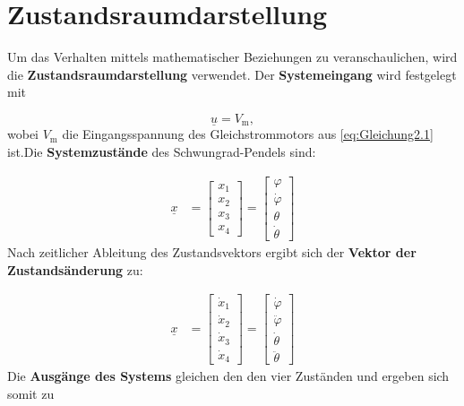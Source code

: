 \pagestyle{aaron}
\section{Zustandsraumdarstellung} \label{sec:Zustandsraumdarstellung}

Um das Verhalten mittels mathematischer Beziehungen zu veranschaulichen, wird die \textbf{Zustandsraumdarstellung} verwendet. Der \textbf{Systemeingang} wird festgelegt mit

\begin{equation} \label{eq:Gleichung3.1}
    \underline{u} = V_{\mathrm{m}},
\end{equation}
\newline
wobei $V_{\mathrm{m}}$ die Eingangsspannung des Gleichstrommotors aus \autoref{eq:Gleichung2.1} ist.Die \textbf{Systemzustände} des Schwungrad-Pendels sind:

\begin{align}
    \underline{x} &=
    \begin{bmatrix} \label{eq:Gleichung3.2}
        x_{\mathrm{1}} \\
        x_{\mathrm{2}} \\
        x_{\mathrm{3}} \\
        x_{\mathrm{4}}
    \end{bmatrix} =
    \begin{bmatrix}
        \varphi     \\
        \dot\varphi \\
        \theta      \\
        \dot\theta
    \end{bmatrix}
\end{align}
\newline
Nach zeitlicher Ableitung des Zustandsvektors ergibt sich der \textbf{Vektor der Zustandsänderung} zu:

\begin{align}
    \underline{x} &=
    \begin{bmatrix} \label{eq:Gleichung3.3}
        \dot x_{\mathrm{1}} \\
        \dot x_{\mathrm{2}} \\
        \dot x_{\mathrm{3}} \\
        \dot x_{\mathrm{4}}
    \end{bmatrix} =
    \begin{bmatrix}
        \dot\varphi     \\
        \ddot\varphi    \\
        \dot\theta      \\
        \ddot\theta
    \end{bmatrix}
\end{align}
\newline
Die \textbf{Ausgänge des Systems} gleichen den den vier Zuständen und ergeben sich somit zu

